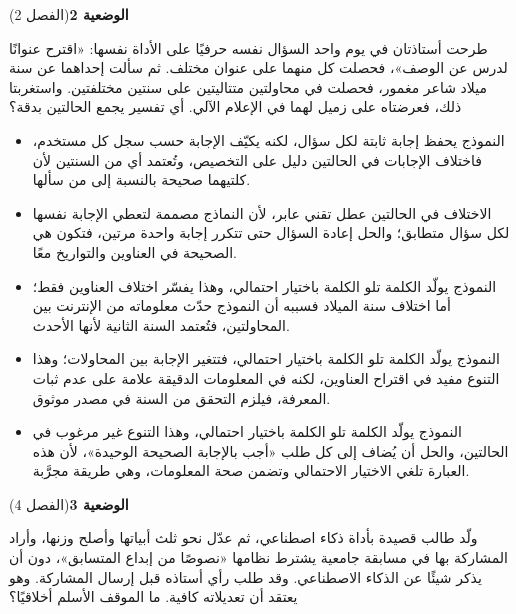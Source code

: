 \documentclass[11pt,a4paper]{article}
\begin{document}
\par\vspace{6pt}
\noindent
{\large\khatt\textbf{الوضعية 2}}\hfill{\small(الفصل 2)}\par\nopagebreak\vspace{3pt}
\setlength{\fboxsep}{7pt}\colorbox{gray!10}{\parbox{\dimexpr\linewidth-14pt}{طرحت أستاذتان في يوم واحد السؤال نفسه حرفيًا على الأداة نفسها: «اقترح عنوانًا لدرس عن الوصف»، فحصلت كل منهما على عنوان مختلف. ثم سألت إحداهما عن سنة ميلاد شاعر مغمور، فحصلت في محاولتين متتاليتين على سنتين مختلفتين. واستغربتا ذلك، فعرضتاه على زميل لهما في الإعلام الآلي. أي تفسير يجمع الحالتين بدقة؟}}\par\nopagebreak
\begin{itemize}[leftmargin=1.0cm, labelsep=6pt, itemsep=3pt, topsep=4pt, parsep=0pt]
  \item[\textbf{أ)}] النموذج يحفظ إجابة ثابتة لكل سؤال، لكنه يكيّف الإجابة حسب سجل كل مستخدم، فاختلاف الإجابات في الحالتين دليل على التخصيص، وتُعتمد أي من السنتين لأن كلتيهما صحيحة بالنسبة إلى من سألها.
  \item[\textbf{ب)}] الاختلاف في الحالتين عطل تقني عابر، لأن النماذج مصممة لتعطي الإجابة نفسها لكل سؤال متطابق؛ والحل إعادة السؤال حتى تتكرر إجابة واحدة مرتين، فتكون هي الصحيحة في العناوين والتواريخ معًا.
  \item[\textbf{ج)}] النموذج يولّد الكلمة تلو الكلمة باختيار احتمالي، وهذا يفسّر اختلاف العناوين فقط؛ أما اختلاف سنة الميلاد فسببه أن النموذج حدّث معلوماته من الإنترنت بين المحاولتين، فتُعتمد السنة الثانية لأنها الأحدث.
  \item[\textbf{د)}] النموذج يولّد الكلمة تلو الكلمة باختيار احتمالي، فتتغير الإجابة بين المحاولات؛ وهذا التنوع مفيد في اقتراح العناوين، لكنه في المعلومات الدقيقة علامة على عدم ثبات المعرفة، فيلزم التحقق من السنة في مصدر موثوق.
  \item[\textbf{هـ)}] النموذج يولّد الكلمة تلو الكلمة باختيار احتمالي، وهذا التنوع غير مرغوب في الحالتين، والحل أن يُضاف إلى كل طلب «أجب بالإجابة الصحيحة الوحيدة»، لأن هذه العبارة تلغي الاختيار الاحتمالي وتضمن صحة المعلومات، وهي طريقة مجرَّبة.
\end{itemize}
\par\vspace{6pt}
\noindent
{\large\khatt\textbf{الوضعية 3}}\hfill{\small(الفصل 4)}\par\nopagebreak\vspace{3pt}
\setlength{\fboxsep}{7pt}\colorbox{gray!10}{\parbox{\dimexpr\linewidth-14pt}{ولّد طالب قصيدة بأداة ذكاء اصطناعي، ثم عدّل نحو ثلث أبياتها وأصلح وزنها، وأراد المشاركة بها في مسابقة جامعية يشترط نظامها «نصوصًا من إبداع المتسابق»، دون أن يذكر شيئًا عن الذكاء الاصطناعي. وقد طلب رأي أستاذه قبل إرسال المشاركة. وهو يعتقد أن تعديلاته كافية. ما الموقف الأسلم أخلاقيًا؟}}\par\nopagebreak
\end{document}
